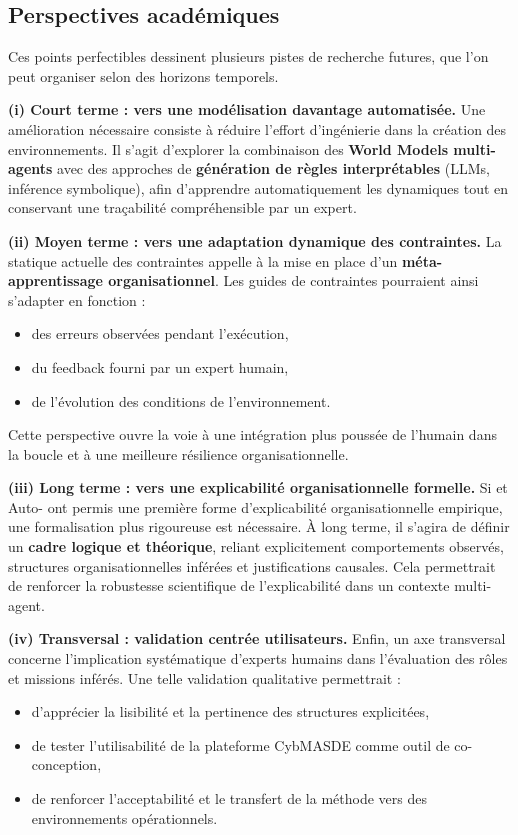 \subsection*{Perspectives académiques}

Ces points perfectibles dessinent plusieurs pistes de recherche futures, que l'on peut organiser selon des horizons temporels.

\medskip
\noindent
\textbf{(i) Court terme : vers une modélisation davantage automatisée.}
Une amélioration nécessaire consiste à réduire l'effort d'ingénierie dans la création des environnements.
Il s'agit d'explorer la combinaison des \textbf{World Models multi-agents} avec des approches de \textbf{génération de règles interprétables} (LLMs, inférence symbolique), afin d'apprendre automatiquement les dynamiques tout en conservant une traçabilité compréhensible par un expert.

\medskip
\noindent
\textbf{(ii) Moyen terme : vers une adaptation dynamique des contraintes.}
La statique actuelle des contraintes appelle à la mise en place d'un \textbf{méta-apprentissage organisationnel}.
Les guides de contraintes pourraient ainsi s'adapter en fonction :
\begin{itemize}
  \item des erreurs observées pendant l'exécution,
  \item du feedback fourni par un expert humain,
  \item de l'évolution des conditions de l'environnement.
\end{itemize}
Cette perspective ouvre la voie à une intégration plus poussée de l'humain dans la boucle et à une meilleure résilience organisationnelle.

\medskip
\noindent
\textbf{(iii) Long terme : vers une explicabilité organisationnelle formelle.}
Si  et Auto- ont permis une première forme d'explicabilité organisationnelle empirique, une formalisation plus rigoureuse est nécessaire.
À long terme, il s'agira de définir un \textbf{cadre logique et théorique}, reliant explicitement comportements observés, structures organisationnelles inférées et justifications causales.
Cela permettrait de renforcer la robustesse scientifique de l'explicabilité dans un contexte multi-agent.

\medskip
\noindent
\textbf{(iv) Transversal : validation centrée utilisateurs.}
Enfin, un axe transversal concerne l'implication systématique d'experts humains dans l'évaluation des rôles et missions inférés.
Une telle validation qualitative permettrait :
\begin{itemize}
  \item d'apprécier la lisibilité et la pertinence des structures explicitées,
  \item de tester l'utilisabilité de la plateforme CybMASDE comme outil de co-conception,
  \item de renforcer l'acceptabilité et le transfert de la méthode vers des environnements opérationnels.
\end{itemize}

